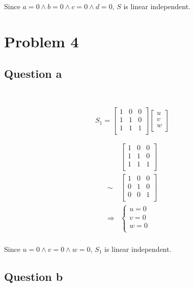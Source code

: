 \documentclass{article}
\begin{document}
Since $a=0\land b=0\land c=0\land d=0$, $S$ is linear independent.

\newpage

\section{Problem 4}

\subsection{Question a}

~

\begin{equation}
\tag{4.1-1}
S_1=\begin{bmatrix}
1&0&0\\
1&1&0\\
1&1&1\\
\end{bmatrix}
\begin{bmatrix}
u\\
v\\
w\\
\end{bmatrix}
\end{equation}

\begin{equation}
\tag{4.1-2}
\begin{split}
&\begin{bmatrix}
1&0&0\\
1&1&0\\
1&1&1\\
\end{bmatrix}\\
\sim & \begin{bmatrix}
1&0&0\\
0&1&0\\
0&0&1\\
\end{bmatrix}\\
\Rightarrow & \begin{cases}
u=0\\
v=0\\
w=0\\
\end{cases}\\
\end{split}
\end{equation}

Since $u=0\land v=0\land w=0$, $S_1$ is linear independent.

\subsection{Question b}
\end{document}
